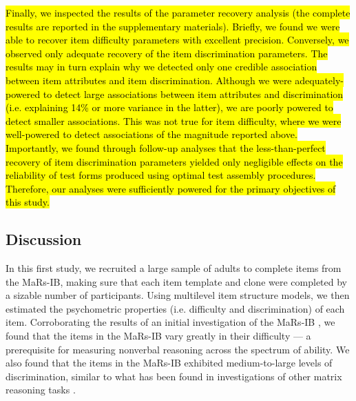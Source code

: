 \documentclass[a4paper,man,natbib,noextraspace]{apa6}
\begin{document}
\hl{Finally, we inspected the results of the parameter recovery analysis (the complete results are reported in the supplementary materials). Briefly, we found we were able to recover item difficulty parameters with excellent precision. Conversely, we observed only adequate recovery of the item discrimination parameters. The results may in turn explain why we detected only one credible association between item attributes and item discrimination. Although we were adequately-powered to detect large associations between item attributes and discrimination (i.e. explaining 14\% or more variance in the latter), we are poorly powered to detect smaller associations. This was not true for item difficulty, where we were well-powered to detect associations of the magnitude reported above. Importantly, we found through follow-up analyses that the less-than-perfect recovery of item discrimination parameters yielded only negligible effects on the reliability of test forms produced using optimal test assembly procedures. Therefore, our analyses were sufficiently powered for the primary objectives of this study.}

\subsection{Discussion}

In this first study, we recruited a large sample of adults to complete items from the MaRs-IB, making sure that each item template and clone were completed by a sizable number of participants. Using multilevel item structure models, we then estimated the psychometric properties (i.e. difficulty and discrimination) of each item. Corroborating the results of an initial investigation of the MaRs-IB \citep{chierchia2019matrix}, we found that the items in the MaRs-IB vary greatly in their difficulty --- a prerequisite for measuring nonverbal reasoning across the spectrum of ability. We also found that the items in the MaRs-IB exhibited medium-to-large levels of discrimination, similar to what has been found in investigations of other matrix reasoning tasks \citep{chiesi2012using, chiesi2012item, van2013shortened}.
\end{document}
